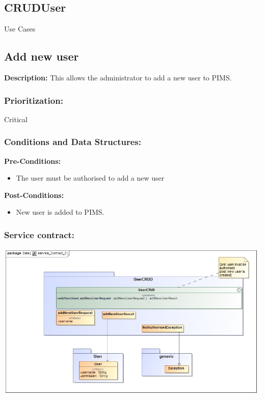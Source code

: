 \newpage
\setlength{\voffset}{-3cm}

\begin{center}
\section{\textbf{\huge{CRUDUser}}}

\Large{Use Cases}
\end{center}


\subsection{Add new user}
\textbf{Description:}
This allows the administrator to add a new user to PIMS.
\subsubsection{Prioritization:}
Critical
\subsubsection{Conditions and Data Structures:}
\textbf{Pre-Conditions:}
\begin{itemize}
	\item The user must be authorised to add a new user
\end{itemize}

\textbf{Post-Conditions:}	
\begin{itemize}
	\item New user is added to PIMS.
\end{itemize}

\subsubsection{Service contract:}
\includegraphics[width=1\linewidth]{./Graphics/4.jpg}

